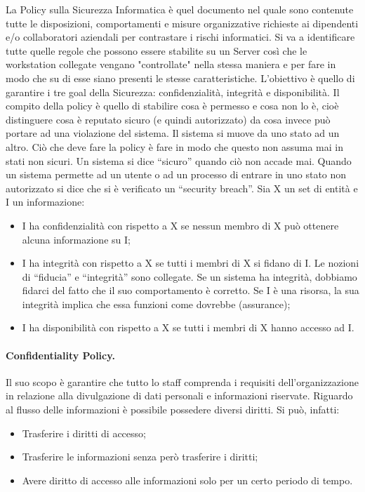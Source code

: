 La Policy sulla Sicurezza Informatica è quel documento nel quale sono
contenute tutte le
disposizioni, comportamenti e misure organizzative richieste ai dipendenti
e/o collaboratori
aziendali per contrastare i rischi informatici. Si va a identificare tutte
quelle regole che possono
essere stabilite su un Server così che le workstation collegate vengano
"controllate" nella stessa
maniera e per fare in modo che su di esse siano presenti le stesse
caratteristiche.
L'obiettivo è quello di garantire i tre goal della Sicurezza:
confidenzialità, integrità e disponibilità.
Il compito della policy è quello di stabilire cosa è permesso e cosa non
lo è, cioè distinguere cosa è
reputato sicuro (e quindi autorizzato) da cosa invece può portare ad una
violazione del sistema. Il
sistema si muove da uno stato ad un altro. Ciò che deve fare la policy è
fare in modo che questo
non assuma mai in stati non sicuri. Un sistema si dice “sicuro” quando ciò
non accade mai.
Quando un sistema permette ad un utente o ad un processo di entrare in uno
stato non autorizzato
si dice che si è verificato un “security breach”.
Sia X un set di entità e I un informazione:
\begin{itemize}
    \item I ha confidenzialità con rispetto a X se nessun membro di X può
          ottenere alcuna
          informazione su I;
    \item I ha integrità con rispetto a X se tutti i membri di X si fidano
          di I. Le nozioni di “fiducia” e
          “integrità” sono collegate. Se un sistema ha integrità, dobbiamo
          fidarci del fatto che il suo
          comportamento è corretto. Se I è una risorsa, la sua integrità implica
          che essa funzioni
          come dovrebbe (assurance);
    \item I ha disponibilità con rispetto a X se tutti i membri di X hanno
          accesso ad I.
\end{itemize}


\paragraph{Confidentiality Policy.}

Il suo scopo è garantire che tutto lo staff comprenda i requisiti
dell'organizzazione in relazione alla
divulgazione di dati personali e informazioni riservate.
Riguardo al flusso delle informazioni è possibile possedere diversi
diritti. Si può, infatti:
\begin{itemize}
    \item Trasferire i diritti di accesso;
    \item Trasferire le informazioni senza però trasferire i diritti;
    \item Avere diritto di accesso alle informazioni solo per un certo
          periodo di tempo.
\end{itemize}

